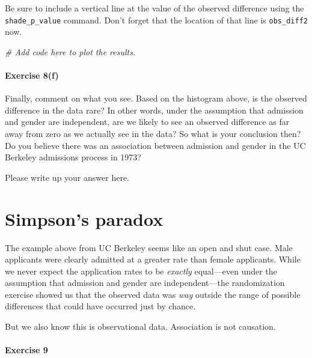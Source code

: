 \documentclass[
]{book}
\newenvironment{Shaded}{\begin{snugshade}}{\end{snugshade}}
\newcommand{\CommentTok}[1]{\textcolor[rgb]{0.56,0.35,0.01}{\textit{#1}}}
\begin{document}
Be sure to include a vertical line at the value of the observed difference using the \texttt{shade\_p\_value} command. Don't forget that the location of that line is \texttt{obs\_diff2} now.

\begin{Shaded}
\begin{Highlighting}[]
\CommentTok{\# Add code here to plot the results.}
\end{Highlighting}
\end{Shaded}

\hypertarget{exercise-8f}{%
\paragraph*{Exercise 8(f)}\label{exercise-8f}}

Finally, comment on what you see. Based on the histogram above, is the observed difference in the data rare? In other words, under the assumption that admission and gender are independent, are we likely to see an observed difference as far away from zero as we actually see in the data? So what is your conclusion then? Do you believe there was an association between admission and gender in the UC Berkeley admissions process in 1973?

Please write up your answer here.

\hypertarget{randomization2-simpson}{%
\section{Simpson's paradox}\label{randomization2-simpson}}

The example above from UC Berkeley seems like an open and shut case. Male applicants were clearly admitted at a greater rate than female applicants. While we never expect the application rates to be \emph{exactly} equal---even under the assumption that admission and gender are independent---the randomization exercise showed us that the observed data was \emph{way} outside the range of possible differences that could have occurred just by chance.

But we also know this is observational data. Association is not causation.

\hypertarget{exercise-9-2}{%
\paragraph*{Exercise 9}\label{exercise-9-2}}
\end{document}
